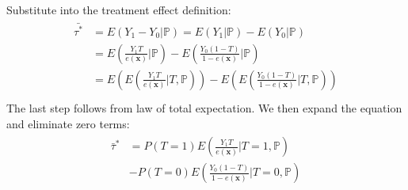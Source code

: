 \documentclass{article}
\begin{document}
Substitute into the treatment effect definition: 
\vspace{-0.1cm} 
\begin{align} 
\label{eq:drm_propensity_1} 
\begin{split} 
\bar{\tau^{*}} &= E(Y_1 - Y_0 | \mathbb{P}) = E(Y_1 | \mathbb{P}) - E(Y_0 | \mathbb{P}) \\ 
&= E(\frac{Y_1T}{e(\mathbf{x})} | \mathbb{P})  - E(\frac{Y_0 (1-T)}{1-e(\mathbf{x})} | \mathbb{P}) \\ 
&= E(E(\frac{Y_1T}{e(\mathbf{x})}|T, \mathbb{P})) - E(E(\frac{Y_0(1-T)}{1-e(\mathbf{x})}|T, \mathbb{P})) \\ 
\end{split} 
\end{align} 
The last step follows from law of total expectation. We then expand the equation and eliminate zero terms: 
\vspace{-0.1cm}
\begin{align} 
\label{eq:drm_propensity_2} 
\begin{split} 
\bar{\tau}^{*} &= P(T = 1) E(\frac{Y_1T}{e(\mathbf{x})}|T = 1, \mathbb{P}) \\ %
& - P(T = 0) E(\frac{Y_0 (1-T)}{1-e(\mathbf{x})} | T = 0, \mathbb{P}) 
\end{split} 
\end{align} 
\end{document}
